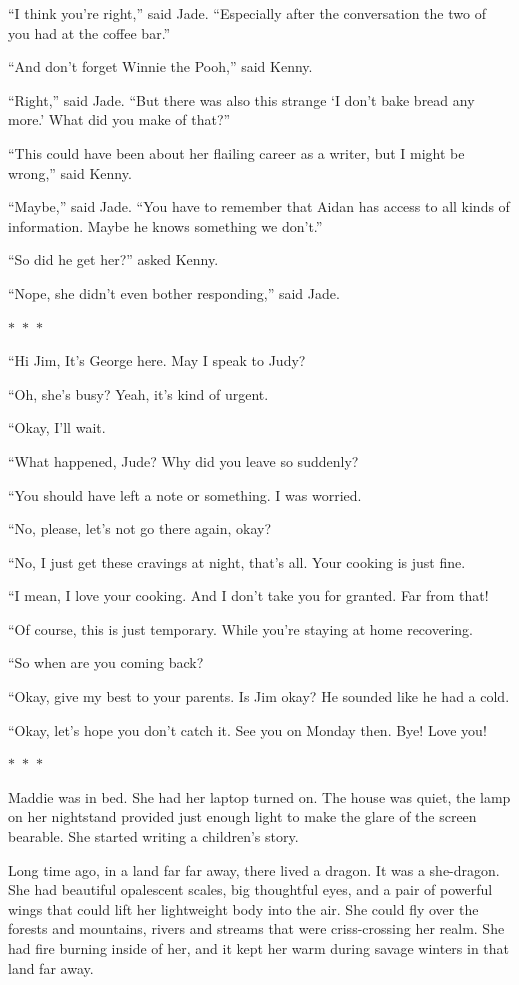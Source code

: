\documentclass{memoir}
\newcommand{\starbreak}{%
\begin{center}
  $\ast$~$\ast$~$\ast$
\end{center}
}
\begin{document}
``I think you're right,'' said Jade. ``Especially after the conversation the two of you had at the coffee bar.''

``And don't forget Winnie the Pooh,'' said Kenny.

``Right,'' said Jade. ``But there was also this strange `I don't bake bread any more.' What did you make of that?''

``This could have been about her flailing career as a writer, but I might be wrong,'' said Kenny.

``Maybe,'' said Jade. ``You have to remember that Aidan has access to all kinds of information. Maybe he knows something we don't.''

``So did he get her?'' asked Kenny.

``Nope, she didn't even bother responding,'' said Jade.

\starbreak

``Hi Jim, It's George here. May I speak to Judy?

``Oh, she's busy? Yeah, it's kind of urgent.

``Okay, I'll wait.

``What happened, Jude? Why did you leave so suddenly?

``You should have left a note or something. I was worried.

``No, please, let's not go there again, okay?

``No, I just get these cravings at night, that's all. Your cooking is just fine.

``I mean, I love your cooking. And I don't take you for granted. Far from that!

``Of course, this is just temporary. While you're staying at home recovering.

``So when are you coming back?

``Okay, give my best to your parents. Is Jim okay? He sounded like he had a cold.

``Okay, let's hope you don't catch it. See you on Monday then. Bye! Love you!

\starbreak

Maddie was in bed. She had her laptop turned on. The house was quiet, the lamp on her nightstand provided just enough light to make the glare of the screen bearable. She started writing a children's story.

Long time ago, in a land far far away, there lived a dragon. It was a she-dragon. She had beautiful opalescent scales, big thoughtful eyes, and a pair of powerful wings that could lift her lightweight body into the air. She could fly over the forests and mountains, rivers and streams that were criss-crossing her realm. She had fire burning inside of her, and it kept her warm during savage winters in that land far away. 
\end{document}
